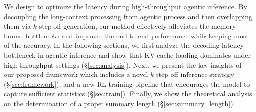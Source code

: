 We design {\model} to optimize the latency during high-throughput agentic inference. By decoupling the long-context processing from agentic process and then overlapping them via $k$-step-off generation, our method effectively alleviates the memory-bound bottlenecks and improves the end-to-end performance while keeping most of the accuracy.
In the following sections, we first analyze the decoding latency bottleneck in agentic inference and show that KV cache loading dominates under high-throughput settings (\S\ref{sec:analysis}).
Next, we present the key insights of our proposed framework {\model} which includes a novel $k$-step-off inference strategy (\S\ref{sec:framework}), and a new RL training pipeline that encourages the model to capture sufficient statistics (\S\ref{sec:train}). Finally, we show the theoretical analysis on the determination of a proper summary length (\S\ref{sec:summary_length}).